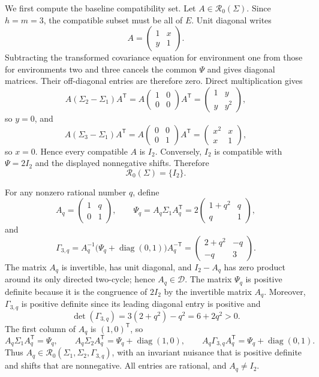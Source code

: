 We first compute the baseline compatibility set.  Let \(A\in\mathcal R_0(\Sigma)\).  Since \(h=m=3\), the compatible subset must be all of \(E\).  Unit diagonal writes
\[
 A=\begin{pmatrix}1&x\\y&1\end{pmatrix}.
\]
Subtracting the transformed covariance equation for environment one from those for environments two and three cancels the common \(\Psi\) and gives diagonal matrices.  Their off-diagonal entries are therefore zero.  Direct multiplication gives
\[
 A(\Sigma_2-\Sigma_1)A^{\mathsf T}
 =A\begin{pmatrix}1&0\\0&0\end{pmatrix}A^{\mathsf T}
 =\begin{pmatrix}1&y\\y&y^2\end{pmatrix},
\]
so \(y=0\), and
\[
 A(\Sigma_3-\Sigma_1)A^{\mathsf T}
 =A\begin{pmatrix}0&0\\0&1\end{pmatrix}A^{\mathsf T}
 =\begin{pmatrix}x^2&x\\x&1\end{pmatrix},
\]
so \(x=0\).  Hence every compatible \(A\) is \(I_2\).  Conversely, \(I_2\) is compatible with \(\Psi=2I_2\) and the displayed nonnegative shifts.  Therefore
\[
 \mathcal R_0(\Sigma)=\{I_2\}.
\]

For any nonzero rational number \(q\), define
\[
 A_q=\begin{pmatrix}1&q\\0&1\end{pmatrix},\qquad
 \Psi_q=A_q\Sigma_1A_q^{\mathsf T}
 =2\begin{pmatrix}1+q^2&q\\q&1\end{pmatrix},
\]
and
\[
 \Gamma_{3,q}
 =A_q^{-1}\bigl(\Psi_q+\operatorname{diag}(0,1)\bigr)A_q^{-\mathsf T}
 =\begin{pmatrix}2+q^2&-q\\-q&3\end{pmatrix}.
\]
The matrix \(A_q\) is invertible, has unit diagonal, and \(I_2-A_q\) has zero product around its only directed two-cycle; hence \(A_q\in\mathcal D\).  The matrix \(\Psi_q\) is positive definite because it is the congruence of \(2I_2\) by the invertible matrix \(A_q\).  Moreover, \(\Gamma_{3,q}\) is positive definite since its leading diagonal entry is positive and
\[
 \det(\Gamma_{3,q})=3(2+q^2)-q^2=6+2q^2>0.
\]
The first column of \(A_q\) is \((1,0)^{\mathsf T}\), so
\[
 A_q\Sigma_1A_q^{\mathsf T}=\Psi_q,
 \qquad
 A_q\Sigma_2A_q^{\mathsf T}=\Psi_q+\operatorname{diag}(1,0),
 \qquad
 A_q\Gamma_{3,q}A_q^{\mathsf T}=\Psi_q+\operatorname{diag}(0,1).
\]
Thus \(A_q\in\mathcal R_0(\Sigma_1,\Sigma_2,\Gamma_{3,q})\), with an invariant nuisance that is positive definite and shifts that are nonnegative.  All entries are rational, and \(A_q\neq I_2\).

